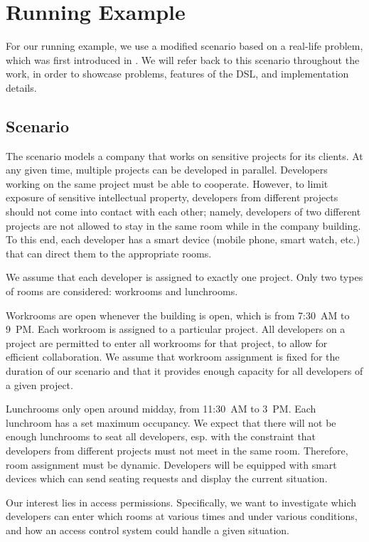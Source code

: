 \chapter{Running Example}
\label{running-example}

For our running example, we use a modified scenario based on a real-life problem, which
was first introduced in \citep{isola2018}. We will refer back to this scenario
throughout the work, in order to showcase problems, features of the DSL, and
implementation details.

\section{Scenario}

The scenario models a company that works on sensitive projects for its clients. At any
given time, multiple projects can be developed in parallel. Developers working on the
same project must be able to cooperate. However, to limit exposure of sensitive
intellectual property, developers from different projects should not come into contact
with each other; namely, developers of two different projects are not allowed to stay in
the same room while in the company building. To this end, each developer has a smart
device (mobile phone, smart watch, etc.) that can direct them to the appropriate rooms.

We assume that each developer is assigned to exactly one project. Only two types of
rooms are considered: workrooms and lunchrooms.

Workrooms are open whenever the building is open, which is from 7:30~AM to 9~PM. Each
workroom is assigned to a particular project. All developers on a project are permitted
to enter all workrooms for that project, to allow for efficient collaboration. We assume
that workroom assignment is fixed for the duration of our scenario and that it provides
enough capacity for all developers of a given project.

Lunchrooms only open around midday, from 11:30~AM to 3~PM. Each lunchroom has a set
maximum occupancy. We expect that there will not be enough lunchrooms to seat all
developers, esp. with the constraint that developers from different projects must not
meet in the same room. Therefore, room assignment must be dynamic. Developers will be
equipped with smart devices which can send seating requests and display the current
situation.

\medskip

Our interest lies in access permissions. Specifically, we want to investigate which
developers can enter which rooms at various times and under various conditions, and how
an access control system could handle a given situation.

